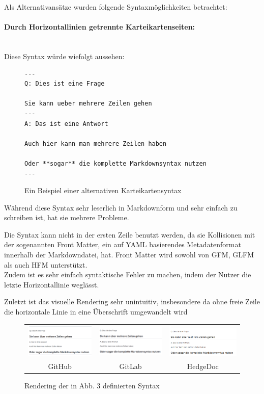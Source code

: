 \documentclass[ngerman]{article}
\begin{document}
Als Alternativansätze wurden folgende Syntaxmöglichkeiten betrachtet:

\paragraph{Durch Horizontallinien getrennte Karteikartenseiten:}~\\
Diese Syntax würde wiefolgt aussehen:
\begin{figure}[H]
\centering
\begin{lstlisting}
---
Q: Dies ist eine Frage

Sie kann ueber mehrere Zeilen gehen
---
A: Das ist eine Antwort

Auch hier kann man mehrere Zeilen haben

Oder **sogar** die komplette Markdownsyntax nutzen
---
\end{lstlisting}
  \caption{Ein Beispiel einer alternativen Karteikartensyntax}
\end{figure}

Während diese Syntax sehr leserlich in Markdownform und sehr einfach zu schreiben ist, hat sie mehrere Probleme.

Die Syntax kann nicht in der ersten Zeile benutzt werden, da sie Kollisionen mit der sogenannten Front Matter, ein auf YAML basierendes Metadatenformat innerhalb der Markdowndatei, hat. Front Matter wird sowohl von GFM, GLFM als auch HFM unterstützt.\\

Zudem ist es sehr einfach syntaktische Fehler zu machen, indem der Nutzer die letzte Horizontallinie weglässt.

Zuletzt ist das visuelle Rendering sehr unintuitiv, insbesondere da ohne freie Zeile die horizontale Linie in eine Überschrift umgewandelt wird

\begin{figure}[H]
\centering
\begin{tabular}{ccc}
\includegraphics[width=50mm]{./figures/GH_Syntax2} & \includegraphics[width=50mm]{./figures/GL_Syntax2} & \includegraphics[width=50mm]{./figures/HD_Syntax2} \\
GitHub & GitLab & HedgeDoc \\
\end{tabular}
\caption{Rendering der in Abb. 3 definierten Syntax}
\end{figure}
\end{document}
